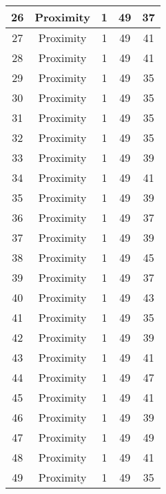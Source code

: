 \documentclass[results.tex]{subfiles}
\begin{document}
\begin{center}
\begin{tabular}{| c || c | c | c | c |}
    \hline
    26 & Proximity & 1 & 49 & 37 \\ 
    \hline
    27 & Proximity & 1 & 49 & 41 \\ 
    \hline
    28 & Proximity & 1 & 49 & 41 \\ 
    \hline
    29 & Proximity & 1 & 49 & 35 \\ 
    \hline
    30 & Proximity & 1 & 49 & 35 \\ 
    \hline
    31 & Proximity & 1 & 49 & 35 \\ 
    \hline
    32 & Proximity & 1 & 49 & 35 \\ 
    \hline
    33 & Proximity & 1 & 49 & 39 \\ 
    \hline
    34 & Proximity & 1 & 49 & 41 \\ 
    \hline
    35 & Proximity & 1 & 49 & 39 \\ 
    \hline
    36 & Proximity & 1 & 49 & 37 \\ 
    \hline
    37 & Proximity & 1 & 49 & 39 \\ 
    \hline
    38 & Proximity & 1 & 49 & 45 \\ 
    \hline
    39 & Proximity & 1 & 49 & 37 \\ 
    \hline
    40 & Proximity & 1 & 49 & 43 \\ 
    \hline
    41 & Proximity & 1 & 49 & 35 \\ 
    \hline
    42 & Proximity & 1 & 49 & 39 \\ 
    \hline
    43 & Proximity & 1 & 49 & 41 \\ 
    \hline
    44 & Proximity & 1 & 49 & 47 \\ 
    \hline
    45 & Proximity & 1 & 49 & 41 \\ 
    \hline
    46 & Proximity & 1 & 49 & 39 \\ 
    \hline
    47 & Proximity & 1 & 49 & 49 \\ 
    \hline
    48 & Proximity & 1 & 49 & 41 \\ 
    \hline
    49 & Proximity & 1 & 49 & 35 \\ 
    \hline   \end{tabular}
\end{center}
\end{document}

